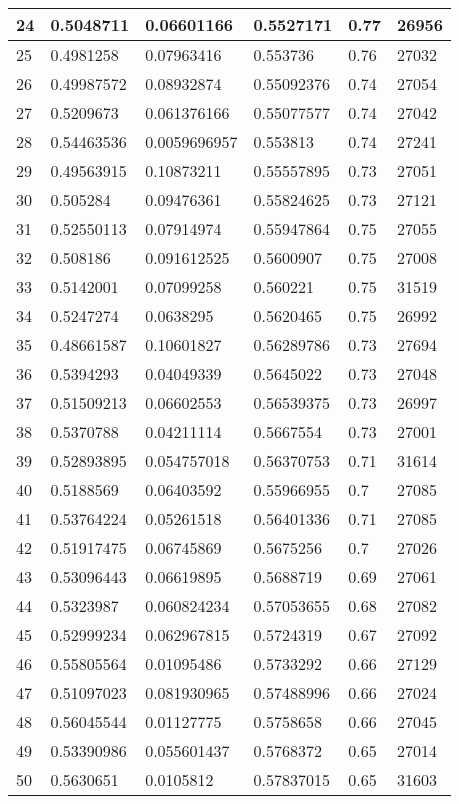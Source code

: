 \begin{longtable}{|l|l|l|l|l|l|}
24 & 0.5048711 & 0.06601166 & 0.5527171 & 0.77 & 26956 \\ \hline 
25 & 0.4981258 & 0.07963416 & 0.553736 & 0.76 & 27032 \\ \hline 
26 & 0.49987572 & 0.08932874 & 0.55092376 & 0.74 & 27054 \\ \hline 
27 & 0.5209673 & 0.061376166 & 0.55077577 & 0.74 & 27042 \\ \hline 
28 & 0.54463536 & 0.0059696957 & 0.553813 & 0.74 & 27241 \\ \hline 
29 & 0.49563915 & 0.10873211 & 0.55557895 & 0.73 & 27051 \\ \hline 
30 & 0.505284 & 0.09476361 & 0.55824625 & 0.73 & 27121 \\ \hline 
31 & 0.52550113 & 0.07914974 & 0.55947864 & 0.75 & 27055 \\ \hline 
32 & 0.508186 & 0.091612525 & 0.5600907 & 0.75 & 27008 \\ \hline 
33 & 0.5142001 & 0.07099258 & 0.560221 & 0.75 & 31519 \\ \hline 
34 & 0.5247274 & 0.0638295 & 0.5620465 & 0.75 & 26992 \\ \hline 
35 & 0.48661587 & 0.10601827 & 0.56289786 & 0.73 & 27694 \\ \hline 
36 & 0.5394293 & 0.04049339 & 0.5645022 & 0.73 & 27048 \\ \hline 
37 & 0.51509213 & 0.06602553 & 0.56539375 & 0.73 & 26997 \\ \hline 
38 & 0.5370788 & 0.04211114 & 0.5667554 & 0.73 & 27001 \\ \hline 
39 & 0.52893895 & 0.054757018 & 0.56370753 & 0.71 & 31614 \\ \hline 
40 & 0.5188569 & 0.06403592 & 0.55966955 & 0.7 & 27085 \\ \hline 
41 & 0.53764224 & 0.05261518 & 0.56401336 & 0.71 & 27085 \\ \hline 
42 & 0.51917475 & 0.06745869 & 0.5675256 & 0.7 & 27026 \\ \hline 
43 & 0.53096443 & 0.06619895 & 0.5688719 & 0.69 & 27061 \\ \hline 
44 & 0.5323987 & 0.060824234 & 0.57053655 & 0.68 & 27082 \\ \hline 
45 & 0.52999234 & 0.062967815 & 0.5724319 & 0.67 & 27092 \\ \hline 
46 & 0.55805564 & 0.01095486 & 0.5733292 & 0.66 & 27129 \\ \hline 
47 & 0.51097023 & 0.081930965 & 0.57488996 & 0.66 & 27024 \\ \hline 
48 & 0.56045544 & 0.01127775 & 0.5758658 & 0.66 & 27045 \\ \hline 
49 & 0.53390986 & 0.055601437 & 0.5768372 & 0.65 & 27014 \\ \hline 
50 & 0.5630651 & 0.0105812 & 0.57837015 & 0.65 & 31603 \\ \hline 
\end{longtable}